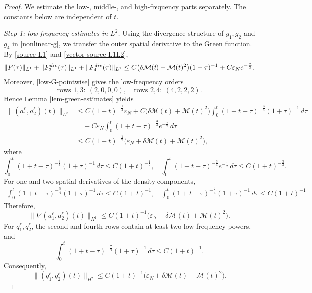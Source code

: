 \documentclass[10pt,a4paper]{amsart}
\begin{document}
\begin{proof}
We estimate the low-, middle-, and high-frequency parts separately.  The constants below are independent of $t$.


\medskip
\noindent\emph{Step 1: low-frequency estimates in $L^2$.} Using the divergence structure of $g_1,g_2$ and $g_4$ in
\eqref{nonlinear-g}, we transfer the outer spatial derivative to the
Green function.
By \eqref{source-L1} and \eqref{vector-source-L1L2},
\begin{align*}
\|F(\tau)\|_{L^1} +\|F_2^{\rm div}(\tau)\|_{L^1} +\|F_4^{\rm div}(\tau)\|_{L^1} \le C\big(\delta\mathcal M(t)+\mathcal M(t)^2\big)(1+\tau)^{-1} +C\varepsilon_Ne^{-\frac{\tau}{2}}.
\end{align*}
Moreover, \eqref{low-G-pointwise} gives the low-frequency orders
\[
\text{rows }1,3:\ (2,0,0,0),
\quad
\text{rows }2,4:\ (4,2,2,2).
\]
Hence Lemma \ref{lem-green-estimates} yields
\begin{align*}
\|(a_1^\ell,a_2^\ell)(t)\|_{L^2} &\le C(1+t)^{-\frac12}\varepsilon_N +C\big(\delta\mathcal M(t)+\mathcal M(t)^2\big) \int_0^t(1+t-\tau)^{-\frac34}(1+\tau)^{-1}\,d\tau\\
&\quad+C\varepsilon_N \int_0^t(1+t-\tau)^{-\frac34}e^{-\frac{\tau}{2}}\,d\tau\\
&\le C(1+t)^{-\frac12} \big(\varepsilon_N+\delta\mathcal M(t)+\mathcal M(t)^2\big),
\end{align*}
where
\[
\int_0^t(1+t-\tau)^{-\frac34}(1+\tau)^{-1}\,d\tau
\le C(1+t)^{-\frac12},
\quad
\int_0^t(1+t-\tau)^{-\frac34}e^{-\frac{\tau}{2}}\,d\tau
\le C(1+t)^{-\frac34}.
\]
For one and two spatial derivatives of the density components,
\begin{align*}
\int_0^t(1+t-\tau)^{-\frac54}(1+\tau)^{-1}\,d\tau  \le C(1+t)^{-1},\quad \int_0^t(1+t-\tau)^{-\frac74}(1+\tau)^{-1}\,d\tau \le C(1+t)^{-1}.
\end{align*}
Therefore,
\[%
\|\nabla(a_1^\ell,a_2^\ell)(t)\|_{H^1}
\le C(1+t)^{-1}
\big(\varepsilon_N+\delta\mathcal M(t)+\mathcal M(t)^2\big).
\]%
For $q_1^\ell,q_2^\ell$, the second and fourth rows contain at least two low-frequency powers, and
\[
\int_0^t(1+t-\tau)^{-\frac74}(1+\tau)^{-1}\,d\tau
\le C(1+t)^{-1}.
\]
Consequently,
\[%
\|(q_1^\ell,q_2^\ell)(t)\|_{H^2}
\le C(1+t)^{-1}
\big(\varepsilon_N+\delta\mathcal M(t)+\mathcal M(t)^2\big).
\]%



\end{proof}
\end{document}
